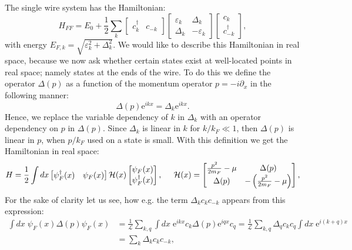 The single wire system has the Hamiltonian:
\begin{equation}
H_{FF} = E_0 + \frac{1}{2}\sum_{k} \begin{bmatrix} c^\dagger_k & c_{-k} \end{bmatrix} \begin{bmatrix} \varepsilon_k & \Delta_k \\ \Delta_k & -\varepsilon_k \end{bmatrix} \begin{bmatrix} c_k \\ c^\dagger_{-k} \end{bmatrix},
\end{equation}
with energy $E_{F,k} = \sqrt{ \varepsilon^2_k + \Delta^2_k}$. We would like to describe this Hamiltonian in real space, because we now ask whether certain states exist at well-located points in real space; namely states at the ends of the wire. To do this we define the operator $\Delta(p)$ as a function of the momentum operator $p = -i\partial_x$ in the following manner:
\begin{equation}
\Delta(p)\text{e}^{ikx} = \Delta_k\text{e}^{ikx}.
\label{eq.Deltapdef}
\end{equation}
Hence, we replace the variable dependency of $k$ in $\Delta_k$ with an operator dependency on $p$ in $\Delta(p)$. Since $\Delta_k$ is linear in $k$ for $k/k_F \ll 1$, then $\Delta(p)$ is linear in $p$, when $p/k_F$ used on a state is small. With this definition we get the Hamiltonian in real space:
\begin{equation}
H = \frac{1}{2}\int dx \begin{bmatrix} \psi^\dagger_{F}(x) & \psi_{F}(x) \end{bmatrix} \mathcal{H}(x) \begin{bmatrix} \psi_{F}(x) \\ \psi^\dagger_{F}(x) \end{bmatrix}, \hspace{0.5cm} \mathcal{H}(x) = \begin{bmatrix} \frac{p^2}{2m_F} - \mu  & \Delta(p) \\ \Delta(p) & -\left( \frac{p^2}{2m_F} - \mu \right) \end{bmatrix},
\label{eq.MFHamiltonianrealspace}
\end{equation}
For the sake of clarity let us see, how e.g. the term $\Delta_kc_kc_{-k}$ appears from this expression:
\begin{align}
\int dx \; \psi_{F}(x) \Delta(p) \psi_{F}(x) &= \frac{1}{\mathcal{L}}\sum_{k,q}\int dx \; \text{e}^{ikx}c_k\Delta(p)\text{e}^{iqx}c_ q = \frac{1}{\mathcal{L}}\sum_{k,q}\Delta_qc_kc_q\int dx \; \text{e}^{i(k+q)x} \nonumber \\
&= \sum_{k}\Delta_kc_kc_{-k}, \nonumber 
\end{align}
